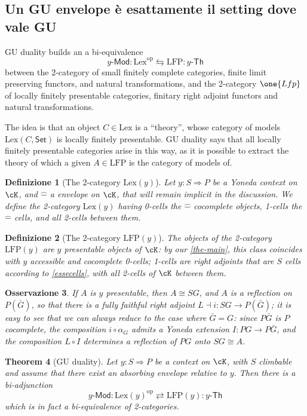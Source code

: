 \documentclass[11pt]{article}
\def\Set{\mathsf{Set}}
\def\To{\Rightarrow}
\def\opp{\mathrm{op}}
\theoremstyle{reference}
\newtheorem{theorem}{Theorem}[section]
\newtheorem{definition}[theorem]{Definizione}
\newtheorem{remark}[theorem]{Osservazione}
\begin{document}
\begin{prop}
\subsection{Un GU envelope è esattamente il setting dove vale GU}
\label{sec:org630f669}

GU duality builds an a bi\hyp{}equivalence
\[
	y\textsf{-Mod} : \text{Lex}^\opp \leftrightarrows \text{LFP} : y\textsf{-Th}
\]
between the 2-category of small finitely complete categories, finite limit preserving functors, and natural transformations, and the 2-category \(\one{Lfp}\) of locally finitely presentable categories, finitary right adjoint functors and natural transformations.

The idea is that an object \(C\in\text{Lex}\) is a ``theory'', whose category of models \(\text{Lex}(C,\Set)\) is locally finitely presentable. GU duality says that all locally finitely presentable categories arise in this way, as it is possible to extract the theory of which a given \(A\in\text{LFP}\) is the category of models of.
\begin{definition}[The 2-category $\text{Lex}(y)$]
	Let $y : S\To P$ be a Yoneda context on $\cK$, and $\widehat{ - }$ a \gu envelope on $\cK$, that will remain implicit in the discussion. We define the 2-category $\text{Lex}(y)$ having 0-cells the $\widehat{ - }$ cocomplete objects, 1-cells the $\widehat{ - }$ cells, and all 2-cells between them.
\end{definition}
\begin{definition}[The 2-category $\text{LFP}({y})$]
	The objects of the 2-category $\text{LFP}({y})$ are $y$ presentable objects of $\cK$: by our \autoref{the-main}, this class coincides with $y$ accessible and cocomplete 0-cells; 1-cells are right adjoints that are $S$ cells according to \autoref{essecells}, with all 2-cells of $\cK$ between them.
\end{definition}
\begin{remark}
	If $A$ is $y$ presentable, then $A\cong S G$, and $A$ is a reflection on $P (\bar G)$, so that there is a fully faithful right adjoint $L\dashv i : S G\to P(\bar G)$; it is easy to see that we can always reduce to the case where $\bar G = G$: since $P\bar G$ is $P$ cocomplete, the composition $i \circ \alpha_G$ admits a Yoneda extension $I : P G\to P \bar G$, and the composition $L \circ I$ determines a reflection of $P G$ onto $S G \cong A$.
\end{remark}
\begin{theorem}[GU duality]\label{guduality}
	Let $y : S\To P$ be a context on $\cK$, with $S$ climbable and assume that there exist an absorbing \gu envelope relative to $y$. Then there is a bi-adjunction
	\[
		y\textsf{-Mod} : \text{Lex}(y)^\opp \rightleftarrows \text{LFP}(y) : y\textsf{-Th}
	\]
	which is in fact a bi-equivalence of 2-categories.
\end{theorem}


\end{prop}
\end{document}
